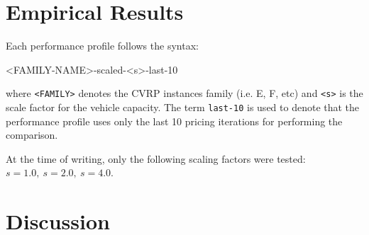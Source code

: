 \begin{comment}
In this thesis, we will use performance profiles extensively to measure each solver by exploiting two performance metrics: \textbf{Time metric}, \textbf{Cost metric}.

A \textbf{Time performance profile} will tell us which resolution method is the fastest in terms of runtime.
A \textbf{Cost performance profile}, instead, will show us the cost ratio of the best upper bound obtained from each resolution method.
The ground truth optimal, as extracted from the dataset, is used instead as the cost baseline.
\end{comment}

\section{Empirical Results}
\label{sec:results-empirical-results}







Each performance profile follows the syntax:
\begin{center}
	\begin{LVerbatim}
		<FAMILY-NAME>-scaled-<s>-last-10
	\end{LVerbatim}
\end{center}
where \texttt{<FAMILY>} denotes the CVRP instances family (i.e. E, F, etc) and \texttt{<s>} is the scale factor for the vehicle capacity.
The term \texttt{last-10} is used to denote that the performance profile uses only the last 10 pricing iterations for performing the comparison.

At the time of writing, only the following scaling factors were tested: $s = 1.0,\ s = 2.0,\ s = 4.0$.

\section{Discussion}
\label{sec:results-discussion}


\begin{comment}
\mytodo{Include the F-n135 grep result to talk about the difficulty of this instance and related ones}
\end{comment}
